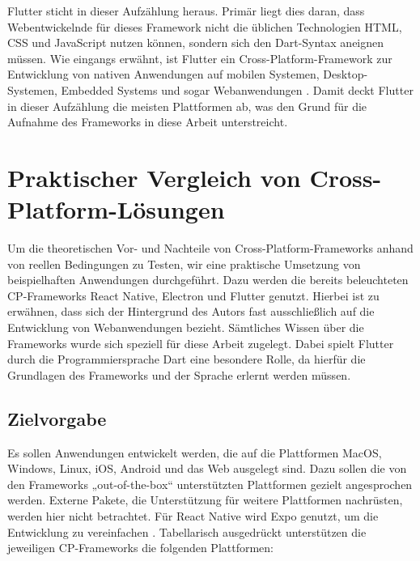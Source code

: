 \documentclass[a4paper]{scrartcl}
\begin{document}
Flutter sticht in dieser Aufzählung heraus. Primär liegt dies daran, dass Webentwickelnde für dieses Framework nicht die üblichen Technologien HTML, CSS und JavaScript nutzen können, sondern sich den Dart-Syntax aneignen müssen. Wie eingangs erwähnt, ist Flutter ein Cross-Platform-Framework zur Entwicklung von nativen Anwendungen auf mobilen Systemen, Desktop-Systemen, Embedded Systems und sogar Webanwendungen \autocite{Flutter}. Damit deckt Flutter in dieser Aufzählung die meisten Plattformen ab, was den Grund für die Aufnahme des Frameworks in diese Arbeit unterstreicht.

\newpage

\section{Praktischer Vergleich von Cross-Platform-Lösungen}

Um die theoretischen Vor- und Nachteile von Cross-Platform-Frameworks anhand von reellen Bedingungen zu Testen, wir eine praktische Umsetzung von beispielhaften Anwendungen durchgeführt. Dazu werden die bereits beleuchteten CP-Frameworks React Native, Electron und Flutter genutzt. Hierbei ist zu erwähnen, dass sich der Hintergrund des Autors fast ausschließlich auf die Entwicklung von Webanwendungen bezieht. Sämtliches Wissen über die Frameworks wurde sich speziell für diese Arbeit zugelegt. Dabei spielt Flutter durch die Programmiersprache Dart eine besondere Rolle, da hierfür die Grundlagen des Frameworks und der Sprache erlernt werden müssen.

\subsection{Zielvorgabe}

Es sollen Anwendungen entwickelt werden, die auf die Plattformen {MacOS}, Windows, Linux, iOS, Android und das Web ausgelegt sind. Dazu sollen die von den Frameworks „out-of-the-box“ unterstützten Plattformen gezielt angesprochen werden. Externe Pakete, die Unterstützung für weitere Plattformen nachrüsten, werden hier nicht betrachtet. Für React Native wird Expo genutzt, um die Entwicklung zu vereinfachen \autocite{Expo}. Tabellarisch ausgedrückt unterstützen die jeweiligen CP-Frameworks die folgenden Plattformen:
\end{document}
